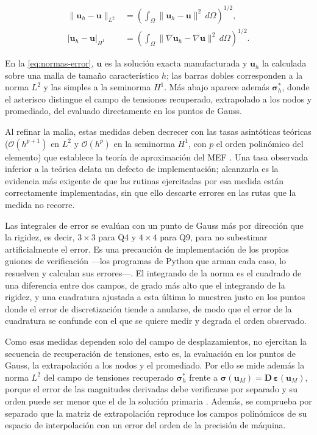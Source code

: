 \begin{equation}
\begin{aligned}
\|\bm{u}_h - \bm{u}\|_{L^2} &= \left( \int_\Omega \|\bm{u}_h - \bm{u}\|^2 \, d\Omega \right)^{1/2}, \\
|\bm{u}_h - \bm{u}|_{H^1} &= \left( \int_\Omega \|\nabla\bm{u}_h - \nabla\bm{u}\|^2 \, d\Omega \right)^{1/2}.
\end{aligned}
\label{eq:normas-error}
\end{equation}

En la \autoref{eq:normas-error}, $\bm{u}$ es la solución exacta manufacturada y $\bm{u}_h$ la calculada sobre una malla de tamaño característico $h$; las barras dobles corresponden a la norma $L^2$ y las simples a la seminorma $H^1$. Más abajo aparece además $\bm{\sigma}^*_h$, donde el asterisco distingue el campo de tensiones recuperado, extrapolado a los nodos y promediado, del evaluado directamente en los puntos de Gauss.

Al refinar la malla, estas medidas deben decrecer con las tasas asintóticas teóricas ($\mathcal{O}(h^{p+1})$ en $L^2$ y $\mathcal{O}(h^p)$ en la seminorma $H^1$, con $p$ el orden polinómico del elemento) que establece la teoría de aproximación del MEF \autocites[pp.~106-107]{strang2008analysis}[pp.~189-190]{hughes2000fem}. Una tasa observada inferior a la teórica delata un defecto de implementación; alcanzarla es la evidencia más exigente de que las rutinas ejercitadas por esa medida están correctamente implementadas, sin que ello descarte errores en las rutas que la medida no recorre.

Las integrales de error se evalúan con un punto de Gauss más por dirección que la rigidez, es decir, $3\times3$ para Q4 y $4\times4$ para Q9, para no subestimar artificialmente el error. Es una precaución de implementación de los propios guiones de verificación ---los programas de Python que arman cada caso, lo resuelven y calculan sus errores---. El integrando de la norma es el cuadrado de una diferencia entre dos campos, de grado más alto que el integrando de la rigidez, y una cuadratura ajustada a esta última lo muestrea justo en los puntos donde el error de discretización tiende a anularse, de modo que el error de la cuadratura se confunde con el que se quiere medir y degrada el orden observado.

Como esas medidas dependen solo del campo de desplazamientos, no ejercitan la secuencia de recuperación de tensiones, esto es, la evaluación en los puntos de Gauss, la extrapolación a los nodos y el promediado. Por ello se mide además la norma $L^2$ del campo de tensiones recuperado $\bm{\sigma}^*_h$ frente a $\bm{\sigma}(\bm{u}_M)=\bm{D}\,\bm{\varepsilon}(\bm{u}_M)$, porque el error de las magnitudes derivadas debe verificarse por separado y su orden puede ser menor que el de la solución primaria \autocite[p.~29]{salari2000mms}. Además, se comprueba por separado que la matriz de extrapolación reproduce los campos polinómicos de su espacio de interpolación con un error del orden de la precisión de máquina.

